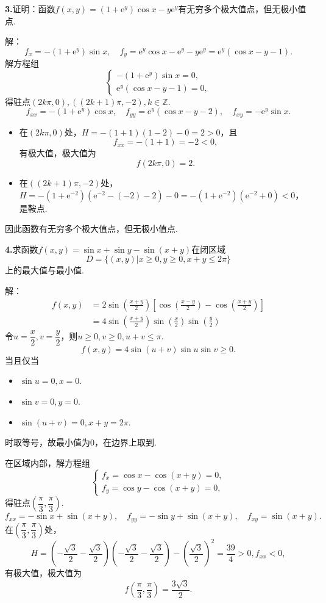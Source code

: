 \documentclass[12pt, a4paper]{article}
\newcommand{\e}{\mathrm{e}}
\begin{document}
\textbf{3.}证明：函数\(f(x, y) = (1 + \e^y) \cos x - y \e^y\)有无穷多个极大值点，但无极小值点.

解：
\[f_x = -(1 + \e^y) \sin x, \quad f_y = \e^y \cos x - \e^y - y \e^y = \e^y(\cos x - y - 1).\]
解方程组
\[\begin{cases}
-(1 + \e^y) \sin x = 0, \\
\e^y(\cos x - y - 1) = 0,
\end{cases}\]
得驻点\((2k\pi, 0), ((2k + 1)\pi, -2), k \in \mathbb{Z}\).
\[f_{xx} = -(1 + \e^y) \cos x, \quad f_{yy} = \e^y(\cos x - y - 2), \quad f_{xy} = -\e^y \sin x.\]
\begin{itemize}
\item 在\((2k\pi, 0)\)处，\(H = -(1 + 1)(1 - 2) - 0 = 2 > 0\)，且
\[f_{xx} = -(1 + 1) = -2 < 0,\]
有极大值，极大值为
\[f(2k\pi, 0) = 2.\]
\item 在\(((2k + 1)\pi, -2)\)处，\(H = -(1 + \e^{-2})(\e^{-2} - (-2) - 2) - 0 = -(1 + \e^{-2})(\e^{-2} + 0) < 0\)，是鞍点.
\end{itemize}
因此函数有无穷多个极大值点，但无极小值点.

\textbf{4.}求函数\(f(x, y) = \sin x + \sin y - \sin(x + y)\)在闭区域
\[D = \{(x, y)|x \geq 0, y \geq 0, x + y \leq 2\pi\}\]
上的最大值与最小值.

解：
\begin{align*}
f(x, y) &= 2\sin\left(\frac{x + y}{2}\right)\left[\cos\left(\frac{x - y}{2}\right) - \cos\left(\frac{x + y}{2}\right)\right] \\
&= 4\sin\left(\frac{x + y}{2}\right) \sin\left(\frac{x}{2}\right) \sin\left(\frac{y}{2}\right)
\end{align*}
令\(u = \dfrac{x}{2}, v = \dfrac{y}{2}\)，则\(u \geq 0, v \geq 0, u + v \leq \pi\).
\[f(x, y) = 4\sin(u + v)\sin u \sin v \geq 0.\]
当且仅当
\begin{itemize}
\item \(\sin u = 0, x = 0\).
\item \(\sin v = 0, y = 0\).
\item \(\sin (u + v) = 0, x + y = 2\pi\).
\end{itemize}
时取等号，故最小值为0，在边界上取到.

在区域内部，解方程组
\[\begin{cases}
f_x = \cos x - \cos(x + y) = 0, \\
f_y = \cos y - \cos(x + y) = 0,
\end{cases}\]
得驻点\(\left(\dfrac{\pi}{3}, \dfrac{\pi}{3}\right)\).
\[f_{xx} = -\sin x + \sin(x + y), \quad f_{yy} = -\sin y + \sin(x + y), \quad f_{xy} = \sin(x + y).\]
在\(\left(\dfrac{\pi}{3}, \dfrac{\pi}{3}\right)\)处，
\[H = \left(-\frac{\sqrt{3}}{2} - \frac{\sqrt{3}}{2}\right)\left(-\frac{\sqrt{3}}{2} - \frac{\sqrt{3}}{2}\right) - \left(\frac{\sqrt{3}}{2}\right)^2 = \frac{39}{4} > 0, f_{xx} < 0,\]
有极大值，极大值为
\[f\left(\frac{\pi}{3}, \frac{\pi}{3}\right) = \frac{3\sqrt{3}}{2}.\]
\end{document}
